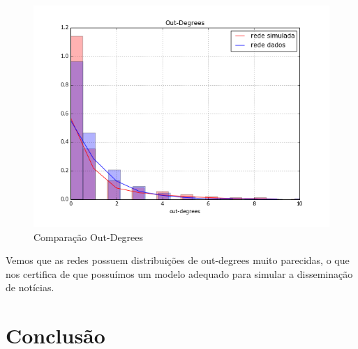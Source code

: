 \documentclass[a4paper,12pt]{article}
\begin{document}
\begin{figure}[ht]
 \centering
 \includegraphics[scale=0.6]{../Notebook/teste.png}
 \caption{Comparação Out-Degrees}
\end{figure}

Vemos que as redes possuem distribuições de out-degrees muito parecidas, o que nos certifica de que possuímos um modelo adequado para
simular a disseminação de notícias.


\pagebreak
\section{Conclusão}






\end{document}
